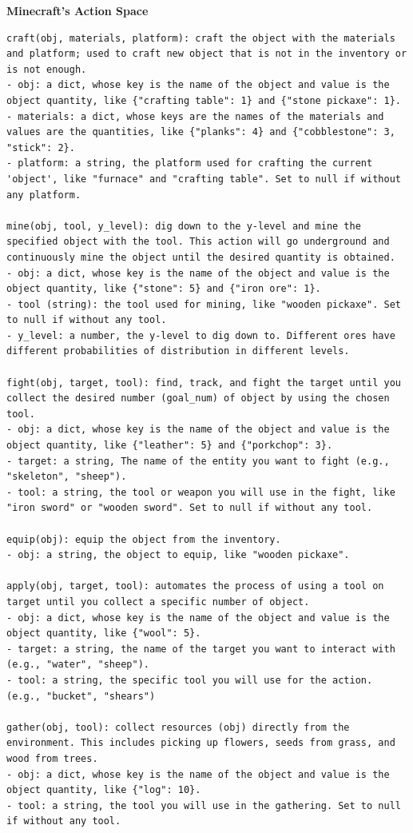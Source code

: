 \documentclass{article} %
\begin{document}
\begin{center}
    \textbf{Minecraft's Action Space}
\end{center}
\lstset{language=}
\begin{lstlisting}
craft(obj, materials, platform): craft the object with the materials and platform; used to craft new object that is not in the inventory or is not enough.
- obj: a dict, whose key is the name of the object and value is the object quantity, like {"crafting table": 1} and {"stone pickaxe": 1}.
- materials: a dict, whose keys are the names of the materials and values are the quantities, like {"planks": 4} and {"cobblestone": 3, "stick": 2}.
- platform: a string, the platform used for crafting the current 'object', like "furnace" and "crafting table". Set to null if without any platform.

mine(obj, tool, y_level): dig down to the y-level and mine the specified object with the tool. This action will go underground and continuously mine the object until the desired quantity is obtained.
- obj: a dict, whose key is the name of the object and value is the object quantity, like {"stone": 5} and {"iron ore": 1}.
- tool (string): the tool used for mining, like "wooden pickaxe". Set to null if without any tool.
- y_level: a number, the y-level to dig down to. Different ores have different probabilities of distribution in different levels.

fight(obj, target, tool): find, track, and fight the target until you collect the desired number (goal_num) of object by using the chosen tool.
- obj: a dict, whose key is the name of the object and value is the object quantity, like {"leather": 5} and {"porkchop": 3}.
- target: a string, The name of the entity you want to fight (e.g., "skeleton", "sheep").
- tool: a string, the tool or weapon you will use in the fight, like "iron sword" or "wooden sword". Set to null if without any tool.

equip(obj): equip the object from the inventory.
- obj: a string, the object to equip, like "wooden pickaxe".

apply(obj, target, tool): automates the process of using a tool on target until you collect a specific number of object.
- obj: a dict, whose key is the name of the object and value is the object quantity, like {"wool": 5}.
- target: a string, the name of the target you want to interact with (e.g., "water", "sheep").
- tool: a string, the specific tool you will use for the action. (e.g., "bucket", "shears")

gather(obj, tool): collect resources (obj) directly from the environment. This includes picking up flowers, seeds from grass, and wood from trees.
- obj: a dict, whose key is the name of the object and value is the object quantity, like {"log": 10}.
- tool: a string, the tool you will use in the gathering. Set to null if without any tool.


\end{lstlisting}
\end{document}

